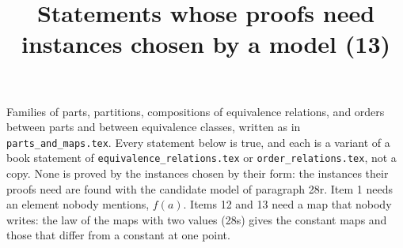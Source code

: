 \documentclass[11pt,a4paper]{article}
\title{Statements whose proofs need instances chosen by a model (13)}
\author{}
\date{}
\begin{document}
\maketitle
Families of parts, partitions, compositions of equivalence relations, and orders between parts and between equivalence classes, written as in \texttt{parts\_and\_maps.tex}. Every statement below is true, and each is a variant of a book statement of \texttt{equivalence\_relations.tex} or \texttt{order\_relations.tex}, not a copy. None is proved by the instances chosen by their form: the instances their proofs need are found with the candidate model of paragraph 28r. Item 1 needs an element nobody mentions, $f(a)$. Items 12 and 13 need a map that nobody writes: the law of the maps with two values (28s) gives the constant maps and those that differ from a constant at one point.
\end{document}
